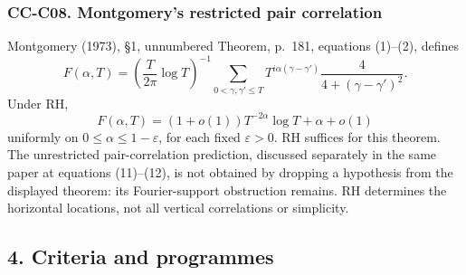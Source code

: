 \documentclass[11pt,a4paper]{article}
\theoremstyle{definition}\newtheorem{definition}[theorem]{Definition}
\theoremstyle{remark}\newtheorem{remark}[theorem]{Remark}
\begin{document}
\subsubsection{CC-C08. Montgomery's restricted pair
correlation}\label{cc-c08.-montgomerys-restricted-pair-correlation}

Montgomery (1973), §1, unnumbered Theorem, p.~181, equations (1)--(2),
defines \[
 F(\alpha,T)=\left(\frac{T}{2\pi}\log T\right)^{-1}
 \sum_{0<\gamma,\gamma'\le T}
 T^{i\alpha(\gamma-\gamma')}
 \frac4{4+(\gamma-\gamma')^2}.
\] Under RH, \[
 F(\alpha,T)=(1+o(1))T^{-2\alpha}\log T+\alpha+o(1)
\] uniformly on \(0\le\alpha\le1-\varepsilon\), for each fixed
\(\varepsilon>0\). RH suffices for this theorem. The unrestricted
pair-correlation prediction, discussed separately in the same paper at
equations (11)--(12), is not obtained by dropping a hypothesis from the
displayed theorem: its Fourier-support obstruction remains. RH
determines the horizontal locations, not all vertical correlations or
simplicity.

\subsection{4. Criteria and programmes}\label{criteria-and-programmes}
\end{document}
